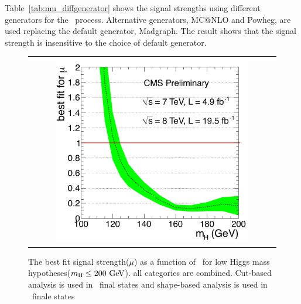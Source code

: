 Table~\ref{tab:mu_diffgenerator} shows the signal strengths 
using different generators for the \qqww\ process. Alternative generators,
MC@NLO and Powheg, are used replacing the default generator, Madgraph.
The result shows that the signal strength is insensitive to the choice
of default generator. 


%
\begin{figure}[htp] 
\centering 
\begin{tabular}{c} 
\includegraphics[width=0.8\textwidth]{figures/mlf7p8TeV_zoomed.pdf}
\end{tabular} 
\caption{The best fit signal strength($\mu$) as a function of \mHi\ for low Higgs 
mass hypotheses($m_{\mathrm{H}}\le200~\mathrm{Ge\kern -0.1em V}$).
all categories are combined. 
Cut-based analysis is used in \SF\ final states 
and shape-based analysis is used in \DF\ finale states} 
\label{fig:mu_mH} 
\end{figure} 

